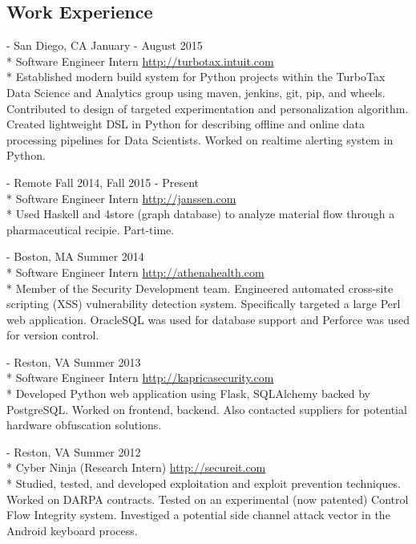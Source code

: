 \documentclass[letter,margin,line]{resume}
\newcommand{\rurl}[1]{\hfill {\footnotesize \url{#1}}}
\newcommand{\rdate}[1]{\hfill {\small #1}}
\renewcommand{\employer}[5]{\item[#1] - #2 \rdate{#3} \\* #4 \rurl{#5} \\*}
\begin{document}
\begin{resume}
        \section{\mysidestyle Work Experience}
        \begin{asparadesc}
            \employer{Intuit}{San Diego, CA}{January - August 2015}{Software Engineer Intern}{http://turbotax.intuit.com}
            Established modern build system for Python projects within the TurboTax Data Science and Analytics group using maven, jenkins, git, pip, and wheels.
            Contributed to design of targeted experimentation and personalization algorithm.
            Created lightweight DSL in Python for describing offline and online data processing pipelines for Data Scientists.
            Worked on realtime alerting system in Python.
            \\
            \employer{Janssen Pharmaceutical}{Remote}{Fall 2014, Fall 2015 - Present}{Software Engineer Intern}{http://janssen.com}
            Used Haskell and 4store (graph database) to analyze material flow through a pharmaceutical recipie. Part-time.
            \\
            \employer{athenahealth}{Boston, MA}{Summer 2014}{Software Engineer Intern}{http://athenahealth.com}
            Member of the Security Development team. Engineered automated cross-site scripting (XSS) vulnerability detection system.
            Specifically targeted a large Perl web application. OracleSQL was used for database support and Perforce was used for
            version control.
            \\
            \employer{Kaprica Security}{Reston, VA}{Summer 2013}{Software Engineer Intern}{http://kapricasecurity.com}
            Developed Python web application using Flask, SQLAlchemy backed by PostgreSQL. Worked on frontend, backend. Also
            contacted suppliers for potential hardware obfuscation solutions.
            \\
            \employer{SecureIT}{Reston, VA}{Summer 2012}{Cyber Ninja (Research Intern)}{http://secureit.com}
            Studied, tested, and developed exploitation and exploit prevention techniques.
            Worked on DARPA contracts.
            Tested on an experimental (now patented) Control Flow Integrity system.
            Investiged a potential side channel attack vector in the Android keyboard process.
        \end{asparadesc}


\end{resume}
\end{document}
